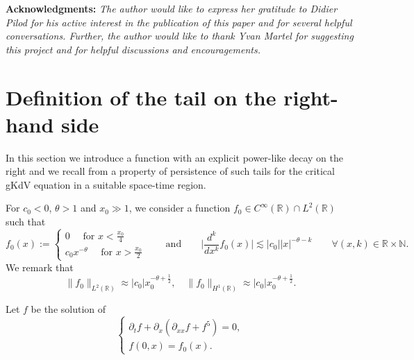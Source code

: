 \documentclass[16pt,english, oneside,reqno]{smfart}
\newcommand{\NN}{\mathbb{N}}
\newcommand{\RR}{\mathbb{R}}
\begin{document}
\vspace{0.4cm}
\textbf{Acknowledgments: }\textit{The author would like to express her gratitude to Didier Pilod for his active interest in the publication of this paper and for several helpful conversations. 
Further, the author would like to thank Yvan Martel for suggesting this project and for helpful discussions and encouragements.} 







\section{Definition of the tail on the right-hand side}\label{S:2}
In this section we introduce a function with an explicit power-like decay on the right 
and we recall from \cite{MMPIII} a property of persistence of such tails
for the critical gKdV equation in a suitable space-time region.

For $c_0<0$, $\theta >1$ and $x_0 \gg 1$, we consider a function
$f_0 \in C^{\infty}(\RR)\cap L^2(\RR)$ such that
\begin{equation}\label{estimaate_on_f0_derivative_on_x}
    f_0(x) := \begin{cases}
        0 \quad \text{ for } x < \frac{x_0}{4}\\
        c_0 x^{-\theta} \quad \text{ for } x > \frac{x_0}{2}
    \end{cases}
    \qquad \text{and} \qquad \Big\lvert \frac{d^k}{dx^k}f_0(x)\Big\rvert \lesssim  |c_0|\lvert x \rvert^{-\theta-k} \qquad \forall (x,k) \in \RR\times\NN.
\end{equation}
We remark that 
\begin{equation}\label{estimate_on_f0_norm_L2}
    \|f_0\|_{L^2(\RR)} \approx |c_0| x_0^{-\theta+\frac{1}{2}},\quad
    \|f_0\|_{H^1(\RR)} \approx |c_0| x_0^{-\theta+\frac{1}{2}}.
\end{equation}

Let $f$ be the solution of
\begin{equation}\label{equation_of_f}
    \begin{cases}
        \partial_t f + \partial_x(\partial_{xx}f+ f^5) = 0,\\
        f(0,x) = f_0(x).
    \end{cases}
\end{equation}
\end{document}
